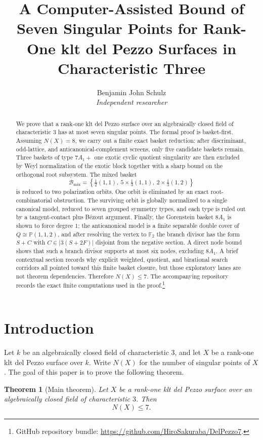 \documentclass[11pt]{article}
\title{A Computer-Assisted Bound of Seven Singular Points for Rank-One klt del Pezzo Surfaces in Characteristic Three}
\author{Benjamin John Schulz\\[4pt]\small\textit{Independent researcher}}
\date{}
\newcommand{\repourl}{\url{https://github.com/HiroSakuraba/DelPezzo7}}
\newtheorem{theorem}{Theorem}[section]
\theoremstyle{definition}
\newcommand{\Pbb}{\mathbb P}
\begin{document}
\maketitle

\begin{abstract}
We prove that a rank-one klt del Pezzo surface over an algebraically closed field of characteristic $3$ has at most seven singular points. The formal proof is basket-first. Assuming $N(X)=8$, we carry out a finite exact basket reduction: after discriminant, odd-lattice, and anticanonical-complement screens, only five candidate baskets remain. Three baskets of type $7A_1+$ one exotic cyclic quotient singularity are then excluded by Weyl normalization of the exotic block together with a sharp bound on the orthogonal root subsystem. The mixed basket
\[
\mathcal B_{\mathrm{mix}}=\left\{\tfrac12(1,1),\ 5\times\tfrac13(1,1),\ 2\times\tfrac13(1,2)\right\}
\]
is reduced to two polarization orbits. One orbit is eliminated by an exact root-combinatorial obstruction. The surviving orbit is globally normalized to a single canonical model, reduced to seven grouped symmetry types, and each type is ruled out by a tangent-contact plus B\'ezout argument. Finally, the Gorenstein basket $8A_1$ is shown to force degree $1$; the anticanonical model is a finite separable double cover of $Q\cong \Pbb(1,1,2)$, and after resolving the vertex to $\mathbb F_2$ the branch divisor has the form $S+C$ with $C\in |3(S+2F)|$ disjoint from the negative section. A direct node bound shows that such a branch divisor supports at most six nodes, excluding $8A_1$. A brief contextual section records why explicit weighted, quotient, and birational search corridors all pointed toward this finite basket closure, but those exploratory lanes are not theorem dependencies. Therefore $N(X)\le 7$. The accompanying repository records the exact finite computations used in the proof.\footnote{GitHub repository bundle: \repourl.}
\end{abstract}

\tableofcontents

\section{Introduction}
Let $k$ be an algebraically closed field of characteristic $3$, and let $X$ be a rank-one klt del Pezzo surface over $k$. Write $N(X)$ for the number of singular points of $X$. The goal of this paper is to prove the following theorem.

\begin{theorem}[Main theorem]\label{thm:main}
Let $X$ be a rank-one klt del Pezzo surface over an algebraically closed field of characteristic $3$. Then
\[
N(X)\le 7.
\]
\end{theorem}
\end{document}
